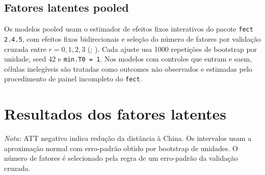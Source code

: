 \documentclass[
  brazilian,
  11pt,
]{article}
\begin{document}
\subsection{Fatores latentes pooled}\label{fatores-latentes-pooled}

Os modelos pooled usam o estimador de efeitos fixos interativos do
pacote \texttt{fect 2.4.5}, com efeitos fixos bidirecionais e seleção do
número de fatores por validação cruzada entre \(r=0,1,2,3\)
(;
). Cada ajuste usa
1000 repetições de bootstrap por unidade, seed 42 e \texttt{min.T0 = 1}.
Nos modelos com controles que entram e saem, células inelegíveis são
tratadas como outcomes não observados e estimadas pelo procedimento de
painel incompleto do \texttt{fect}.

\section{Resultados dos fatores
latentes}\label{resultados-dos-fatores-latentes}

\begin{table}[!h]
\centering
\caption{\label{tab:table-ife-main}Modelos pooled de fatores latentes para a distância ideal à China.}
\centering
{}
\end{table}

\textit{Nota:} ATT negativo indica redução da distância à China. Os
intervalos usam a aproximação normal com erro-padrão obtido por
bootstrap de unidades. O número de fatores é selecionado pela regra de
um erro-padrão da validação cruzada.
\end{document}
